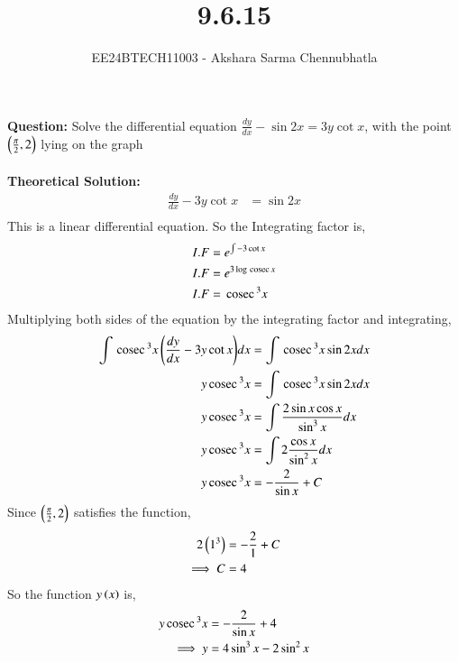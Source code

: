 \documentclass[journal]{IEEEtran}
\begin{document}

\vspace{3cm}

\title{9.6.15}
\author{EE24BTECH11003 - Akshara Sarma Chennubhatla}
{\let\newpage\relax\maketitle}
\textbf{Question:}
Solve the differential equation $\frac{dy}{dx} - \sin 2x = 3y \cot x$, with the point $\left(\frac{\pi}{2}, 2\right)$ lying on the graph\\

\solution\\
\textbf{Theoretical Solution:}\\

\begin{align}
	\frac{dy}{dx} - 3y \cot x &= \sin2x\\
\end{align}
This is a linear differential equation. So the Integrating factor is,
\begin{align}
	I.F &= e ^ {\int{-3 \cot x}}\\
	I.F &= e ^ {3\log\,\text{cosec}\, x}\\
	I.F &= \,\text{cosec}\,^3 x\\
\end{align}
Multiplying both sides of the equation by the integrating factor and integrating,
\begin{align}
	\int{\,\text{cosec}\,^3 x\ensuremath{\left(\frac{dy}{dx} - 3y\cot x\right)}} dx &= \int{\,\text{cosec}\,^3 x \sin2x} dx\\
	y \,\text{cosec}\,^3 x &= \int{\,\text{cosec}\,^3 x \sin2x} dx\\
	y \,\text{cosec}\,^3 x &= \int{\frac{2 \sin x \cos x}{\sin^3 x}} dx\\
	y \,\text{cosec}\,^3 x &= \int{2\frac{\cos x}{\sin^2 x}} dx\\
	y \,\text{cosec}\,^3 x &= -\frac{2}{\sin x} + C\\
\end{align}
Since $\left(\frac{\pi}{2}, 2\right)$ satisfies the function,
\begin{align}
	2 \left(1^3\right) &= -\frac{2}{1} + C\\
	\implies C &= 4\\
\end{align}
So the function $y\left(x\right)$ is,
\begin{align}
	y \,\text{cosec}\,^3 x &= -\frac{2}{\sin x} + 4\\
	\implies y &= 4 \sin^3 x - 2 \sin^2 x\\
\end{align}
\end{document}
